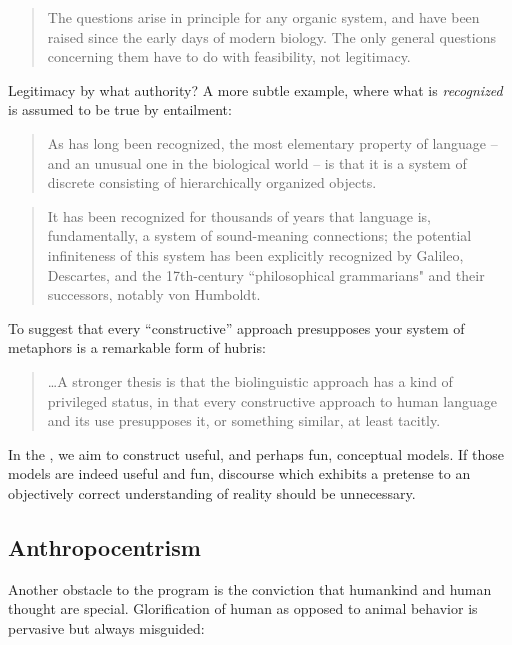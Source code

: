 \begin{quote} 
The questions arise in principle for any organic system, and have been raised since the early days of modern biology. The only general questions concerning them have to do with feasibility, not legitimacy. \citep[133]{Chomsky2008}
\end{quote}

Legitimacy by what authority? A more subtle example, where what is \textit{recognized} is assumed to be true by entailment:

\begin{quote} 
As has long been recognized, the most elementary property of language – and an unusual one in the biological world – is that it is a system of discrete  consisting of hierarchically organized objects. \citep[134]{Chomsky2008}
\end{quote}

\begin{quote} 
It has been recognized for thousands of years that language is, fundamentally, a system of sound-meaning connections; the potential infiniteness of this system has been explicitly recognized by Galileo, Descartes, and the 17th-century ``philosophical grammarians" and their successors, notably von Humboldt. \citep{HauserEtAl2002}
\end{quote}

To suggest that every “constructive” approach presupposes your system of metaphors is a remarkable form of hubris:

\begin{quote} 
…A stronger thesis is that the biolinguistic approach has a kind of privileged status, in that every constructive approach to human language and its use presupposes it, or something similar, at least tacitly. \citep{Chomsky2001a}
\end{quote}

  In the , we aim to construct useful, and perhaps fun, conceptual models. If those models are indeed useful and fun, discourse which exhibits a pretense to an objectively correct understanding of reality should be unnecessary.

\subsection{Anthropocentrism}

Another obstacle to the  program is the conviction that humankind and human thought are special. Glorification of human as opposed to animal behavior is pervasive but always misguided:


